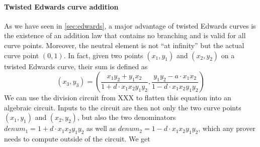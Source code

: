 \paragraph{Twisted Edwards curve addition} As we have seen in \ref{sec:edwards}, a major advantage of twisted Edwards curves is the existence of an addition law that contains no branching and is valid for all curve points. Moreover, the neutral element is not ``at infinity'' but the actual curve point $(0,1)$. In fact, given two points $(x_1,y_1)$ and $(x_2,y_2)$ on a twisted Edwards curve, their sum is defined as
$$
(x_3,y_3) = \left(\frac{x_1y_2+y_1x_2}{1+d\cdot x_1x_2y_1y_2}, \frac{y_1y_2-a\cdot x_1x_2}{1-d\cdot x_1x_2y_1y_2}\right)
$$
We can use the division circuit from XXX to flatten this equation into an algebraic circuit. Inputs to the circuit are then not only the two curve points $(x_1,y_1)$ and $(x_2,y_2)$, but also the two denominators $denum_1 = 1+d\cdot x_1x_2y_1y_2$ as well as $denum_2= 1-d\cdot x_1x_2y_1y_2$, which any prover needs to compute outside of the circuit. We get
